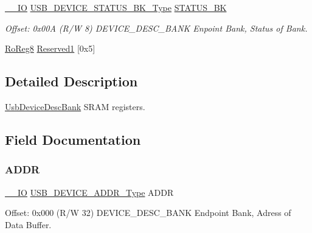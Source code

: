 \begin{DoxyCompactItemize}
\mbox{\hyperlink{core__cm0plus_8h_aec43007d9998a0a0e01faede4133d6be}{\+\_\+\+\_\+\+IO}} \mbox{\hyperlink{union_u_s_b___d_e_v_i_c_e___s_t_a_t_u_s___b_k___type}{U\+S\+B\+\_\+\+D\+E\+V\+I\+C\+E\+\_\+\+S\+T\+A\+T\+U\+S\+\_\+\+B\+K\+\_\+\+Type}} \mbox{\hyperlink{struct_usb_device_desc_bank_a9aa0d666580c9f3c48ea3193f8d60961}{S\+T\+A\+T\+U\+S\+\_\+\+BK}}
\begin{DoxyCompactList}\small\item\em Offset\+: 0x00A (R/W 8) D\+E\+V\+I\+C\+E\+\_\+\+D\+E\+S\+C\+\_\+\+B\+A\+NK Enpoint Bank, Status of Bank. \end{DoxyCompactList}\item 
\mbox{\hyperlink{group___s_a_m_d21_e15_a__definitions_ga0d957f1433aaf5d70e4dc2b68288442d}{Ro\+Reg8}} \mbox{\hyperlink{struct_usb_device_desc_bank_a63b7508a517d1f83bd45a93c1a7f2567}{Reserved1}} \mbox{[}0x5\mbox{]}
\end{DoxyCompactItemize}


\subsection{Detailed Description}
\mbox{\hyperlink{struct_usb_device_desc_bank}{Usb\+Device\+Desc\+Bank}} S\+R\+AM registers. 

\subsection{Field Documentation}
\mbox{\label{struct_usb_device_desc_bank_ac4e95e16d23e6497f99e97a6f9d0871e}} 
\subsubsection{\texorpdfstring{ADDR}{ADDR}}
{\footnotesize\ttfamily \mbox{\hyperlink{core__cm0plus_8h_aec43007d9998a0a0e01faede4133d6be}{\+\_\+\+\_\+\+IO}} \mbox{\hyperlink{union_u_s_b___d_e_v_i_c_e___a_d_d_r___type}{U\+S\+B\+\_\+\+D\+E\+V\+I\+C\+E\+\_\+\+A\+D\+D\+R\+\_\+\+Type}} A\+D\+DR}



Offset\+: 0x000 (R/W 32) D\+E\+V\+I\+C\+E\+\_\+\+D\+E\+S\+C\+\_\+\+B\+A\+NK Endpoint Bank, Adress of Data Buffer. 

\mbox{\label{struct_usb_device_desc_bank_a2fdbc64be3006a088569d7647a3dab67}} 
